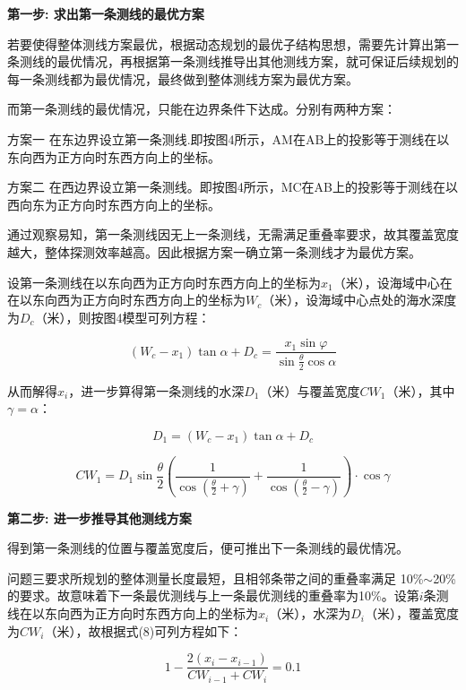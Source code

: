 
\textbf{第一步: 求出第一条测线的最优方案}

若要使得整体测线方案最优，根据动态规划的最优子结构思想，需要先计算出第一条测线的最优情况，再根据第一条测线推导出其他测线方案，就可保证后续规划的每一条测线都为最优情况，最终做到整体测线方案为最优方案。

而第一条测线的最优情况，只能在边界条件下达成。分别有两种方案：

方案一 在东边界设立第一条测线.即按图4所示，AM在AB上的投影等于测线在以东向西为正方向时东西方向上的坐标。

方案二 在西边界设立第一条测线。即按图4所示，MC在AB上的投影等于测线在以西向东为正方向时东西方向上的坐标。

通过观察易知，第一条测线因无上一条测线，无需满足重叠率要求，故其覆盖宽度越大，整体探测效率越高。因此根据方案一确立第一条测线才为最优方案。

设第一条测线在以东向西为正方向时东西方向上的坐标为$x_1$（米），设海域中心在在以东向西为正方向时东西方向上的坐标为$W_c$（米），设海域中心点处的海水深度为$D_c$（米），则按图4模型可列方程：

\begin{equation}
    (W_c - x_1) \tan\alpha+D_c = \frac{x_1\sin \varphi}{\sin \frac{\theta}{2} \cos \alpha}
\end{equation}

从而解得$x_i$，进一步算得第一条测线的水深$D_1$（米）与覆盖宽度$CW_1$（米），其中$\gamma = \alpha$：

\begin{equation}
    D_1 =  (W_c - x_1) \tan{\alpha} + D_c
\end{equation}

\begin{equation}
    CW_1 = D_1\sin\frac{\theta}{2}\left(\frac{1}{\cos(\frac{\theta}{2}+\gamma)} + \frac{1}{\cos(\frac{\theta}{2}-\gamma)}\right) \cdot \cos \gamma
\end{equation}

\textbf{第二步: 进一步推导其他测线方案}

得到第一条测线的位置与覆盖宽度后，便可推出下一条测线的最优情况。

问题三要求所规划的整体测量长度最短，且相邻条带之间的重叠率满足 10\%$\sim$20\% 的要求。故意味着下一条最优测线与上一条最优测线的重叠率为10\%。设第$i$条测线在以东向西为正方向时东西方向上的坐标为$x_i$（米），水深为$D_i$（米），覆盖宽度为$CW_i$（米），故根据式(8)可列方程如下：

\begin{equation}
    1-\frac{2(x_i-x_{i-1})}{CW_{i-1}+CW_i} = 0.1
\end{equation}

